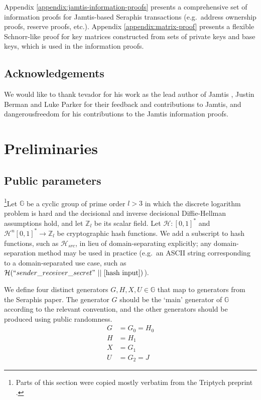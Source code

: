Appendix \ref{appendix:jamtis-information-proofs} presents a comprehensive set of information proofs for Jamtis-based Seraphis transactions (e.g.\ address ownership proofs, reserve proofs, etc.). Appendix \ref{appendix:matrix-proof} presents a flexible Schnorr-like proof for key matrices constructed from sets of private keys and base keys, which is used in the information proofs.


\subsection{Acknowledgements}
\label{subsec:intro-acknowledgements}

We would like to thank tevador for his work as the lead author of Jamtis \cite{jamtis}, Justin Berman and Luke Parker for their feedback and contributions to Jamtis, and dangerousfreedom for his contributions to the Jamtis information proofs.



\section{Preliminaries}
\label{sec:preliminaries}

\subsection{Public parameters}
\label{subsec:preliminaries-public-parameters}

\footnote{Parts of this section were copied mostly verbatim from the Triptych preprint \cite{triptych-preprint}.}Let $\mathbb{G}$ be a cyclic group of prime order $l > 3$ in which the discrete logarithm problem is hard and the decisional and inverse decisional Diffie-Hellman assumptions hold, and let $\mathbb{Z}_l$ be its scalar field. Let $\mathcal{H}: [0,1]^*$ and $\mathcal{H}^n [0,1]^* \to \mathbb{Z}_l$ be cryptographic hash functions. We add a subscript to hash functions, such as $\mathcal{H}_{src}$, in lieu of domain-separating explicitly; any domain-separation method may be used in practice (e.g.\ an ASCII string corresponding to a domain-separated use case, such as $\mathcal{H}(``sender\_receiver\_secret"\ ||\ [\textrm{hash input}])$).

We define four distinct generators $G, H, X, U \in \mathbb{G}$ that map to generators from the Seraphis paper. The generator $G$ should be the `main' generator of $\mathbb{G}$ according to the relevant convention, and the other generators should be produced using public randomness.\vspace{.115cm}
\begin{align*}
    G &= G_0 = H_0 \\
    H &= H_1       \\
    X &= G_1       \\
    U &= G_2 = J
\end{align*}

